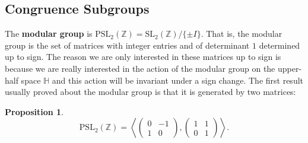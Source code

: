 \documentclass[12pt]{book}
\newtheorem{proposition}{Proposition}[section]
\theoremstyle{definition}\newframedtheorem{method}{Method}
\newcommand{\SL}{\mathrm{SL}}
\newcommand{\PSL}{\mathrm{PSL}}
\newcommand{\Z}{\mathbb{Z}}
\renewcommand{\H}{\mathbb{H}}
\newcommand{\<}{\langle}
\renewcommand{\>}{\rangle}
\begin{document}
    \subsection*{Congruence Subgroups}
      The \textbf{modular group} is $\PSL_{2}(\Z) = \SL_{2}(\Z)/\{\pm I\}$. That is, the modular group is the set of matrices with integer entries and of determinant $1$ determined up to sign. The reason we are only interested in these matrices up to sign is because we are really interested in the action of the modular group on the upper-half space $\H$ and this action will be invariant under a sign change. The first result usually proved about the modular group is that it is generated by two matrices:

      \begin{proposition}\label{prop:PSL_generator}
          \[
            \PSL_{2}(\Z) = \left\<\begin{pmatrix} 0 &-1 \\ 1 & 0 \end{pmatrix},\begin{pmatrix} 1 & 1 \\ 0 & 1 \end{pmatrix} \right\>.
          \]
      \end{proposition}
\end{document}
